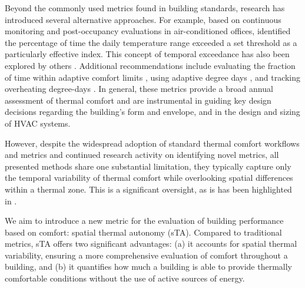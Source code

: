 Beyond the commonly used metrics found in building standards, research has introduced several alternative approaches. For example, based on continuous monitoring and post-occupancy evaluations in air-conditioned offices, \citet{li_improved_2020} identified the percentage of time the daily temperature range exceeded a set threshold as a particularly effective index. This concept of temporal exceedance has also been explored by others \citep{borgeson_comfort_2011, nicol_suggestion_2009}. Additional recommendations include evaluating the fraction of time within adaptive comfort limits \citep{albatayneh_development_2019}, using adaptive degree days \citep{mcgilligan_adaptive_2011}, and tracking overheating degree-days \citep{estrella_guillen_comparing_2019}. In general, these metrics provide a broad annual assessment of thermal comfort and are instrumental in guiding key design decisions regarding the building's form and envelope, and in the design and sizing of HVAC systems.

However, despite the widespread adoption of standard thermal comfort workflows and metrics and continued research activity on identifying novel metrics, all presented methods share one substantial limitation, they typically capture only the temporal variability of thermal comfort while overlooking spatial differences within a thermal zone. This is a significant oversight, as is has been highlighted in \citep{mishra_thermal_2016, kramer_personal_2023}.

We aim to introduce a new metric for the evaluation of building performance based on comfort: spatial thermal autonomy (sTA). Compared to traditional metrics, sTA offers two significant advantages: (a) it accounts for spatial thermal variability, ensuring a more comprehensive evaluation of comfort throughout a building, and (b) it quantifies how much a building is able to provide thermally comfortable conditions without the use of active sources of energy.




